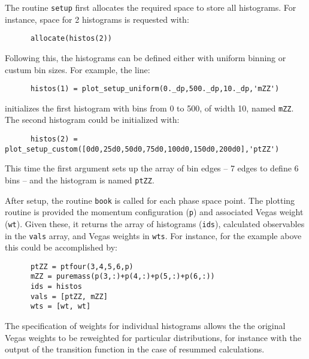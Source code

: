 The routine {\tt setup} first allocates the required space to store
all histograms.  For instance, space for 2 histograms is requested with:
\begin{verbatim}
      allocate(histos(2))
\end{verbatim}
Following this, the histograms can be defined either with uniform binning
or custum bin sizes.  For example, the line:
\begin{verbatim}
      histos(1) = plot_setup_uniform(0._dp,500._dp,10._dp,'mZZ')
\end{verbatim}
initializes the first histogram with bins from 0 to 500, of width 10, named
{\tt mZZ}.  The second histogram could be initialized with:
\begin{verbatim}
      histos(2) = plot_setup_custom([0d0,25d0,50d0,75d0,100d0,150d0,200d0],'ptZZ')
\end{verbatim}
This time the first argument sets up the array of bin edges -- 7 edges
to define 6 bins -- and the histogram is named {\tt ptZZ}.

After setup, the routine {\tt book} is called for each phase space
point.  The plotting routine is provided the momentum configuration ({\tt p})
and associated Vegas weight ({\tt wt}).  Given these, it returns the array of
histograms ({\tt ids}), calculated observables in the
{\tt vals} array, and Vegas weights in {\tt wts}.
For instance, for the example above this could be accomplished by:
\begin{verbatim}
      ptZZ = ptfour(3,4,5,6,p)
      mZZ = puremass(p(3,:)+p(4,:)+p(5,:)+p(6,:))
      ids = histos
      vals = [ptZZ, mZZ]
      wts = [wt, wt]
\end{verbatim}
The specification of weights for individual histograms allows the
the original Vegas weights to be reweighted for particular distributions,
for instance with the output of the transition function in the case of
resummed calculations.
